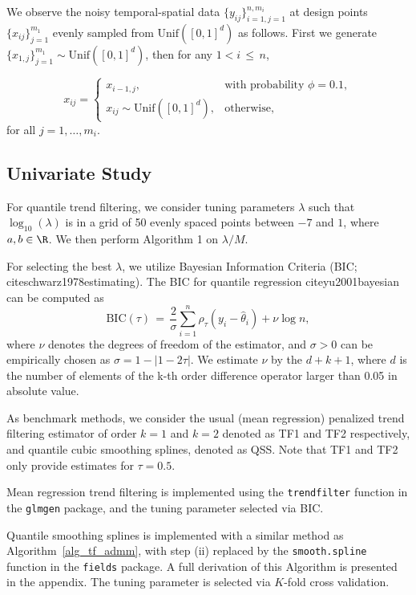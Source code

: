 \documentclass[twoside,11pt]{article}
\begin{document}
We observe the noisy temporal-spatial data \(\{y_{ij}\}_{i=1,j=1}^{n,m_i}\) at design points \(\{x_{ij}\}_{j=1}^{m_1}\) evenly sampled from \(\text{Unif}([0,1]^d)\) as follows. First we generate \(\{x_{1,j}\}_{j=1}^{m_1} \sim \text{Unif}([0,1]^d)\), then for any \(1 < i \,\leq\, n\),

\begin{equation}\label{eq:st_xij}
x_{ij} = 
\begin{cases}
x_{i-1,j}, & \text{with probability } \phi = 0.1,\\
x_{ij} \sim \text{Unif}([0,1]^d), & \text{otherwise},
\end{cases}
\end{equation}
for all \(j = 1, \ldots, m_i\).





\subsection{Univariate Study}

For quantile trend filtering, we consider tuning parameters $\lambda$ such that $\log_{10}(\lambda)$ is in a grid of 50 evenly spaced points between $-7$ and $1$, where $a, b\in \R$. We then perform Algorithm 1 on $\lambda/M$. 

For selecting the best $\lambda$, we utilize Bayesian Information Criteria (BIC; cite{schwarz1978estimating}). The BIC for quantile regression cite{yu2001bayesian} can be computed as
\[
\text{BIC}(\tau) \,=\, \frac{2}{\sigma} \sum_{i=1}^{n} \rho_{\tau}(y_{i} - \hat{\theta}_{i}) + \nu \log n,
\]
where $\nu$ denotes the degrees of freedom of the estimator, and $\sigma > 0$ can be empirically chosen as $\sigma = 1 - |1 - 2\tau|$. We estimate $\nu$ by the $d + k + 1$, where $d$ is the number of elements of the k-th order difference operator larger than 0.05 in absolute value.  

As benchmark methods, we consider the usual (mean regression) penalized trend filtering estimator of order $k = 1$ and $k = 2$ denoted as TF1 and TF2 respectively, and quantile cubic smoothing splines, denoted as QSS. Note that TF1 and TF2 only provide estimates for $\tau = 0.5$. 

Mean regression trend filtering is implemented using the \texttt{trendfilter} function in the \texttt{glmgen} package, and the tuning parameter selected via BIC. 

Quantile smoothing splines is implemented with a similar method as Algorithm~\ref{alg_tf_admm}, with step (ii) replaced by the \texttt{smooth.spline} function in the \texttt{fields} package. A full derivation of this Algorithm is presented in the appendix. The tuning parameter is selected via $K$-fold cross validation. 
\end{document}
